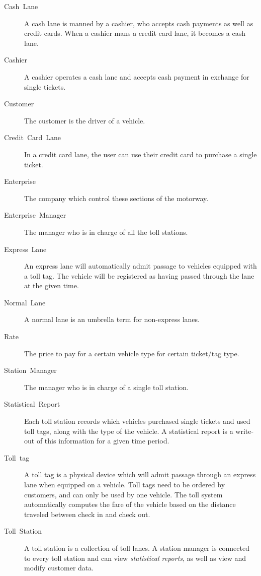 \begin{description}
\item [{Cash~Lane}] A cash lane is manned by a cashier, who accepts cash
payments as well as credit cards. When a cashier mans a credit card
lane, it becomes a cash lane.

\item [{Cashier}] A cashier operates a cash lane and accepts cash payment
in exchange for single tickets.

\item [{Customer}] The customer is the driver of a vehicle.

\item [{Credit~Card~Lane}] In a credit card lane, the user can use their
credit card to purchase a single ticket.

\item [{Enterprise}] The company which control these sections of the motorway.

\item [{Enterprise~Manager}] The manager who is in charge of all the toll stations.

\item [{Express~Lane}] An express lane will automatically admit passage
to vehicles equipped with a toll tag. The vehicle will be registered
as having passed through the lane at the given time.

\item [{Normal~Lane}] A normal lane is an umbrella term for non-express lanes.

\item [{Rate}] The price to pay for a certain vehicle type for certain ticket/tag type.

\item [{Station~Manager}] The manager who is in charge of a single toll station.

\item [{Statistical~Report}] Each toll station records which vehicles
purchased single tickets and used toll tags, along with the type of
the vehicle. A statistical report is a write-out of this information
for a given time period.

\item [{Toll~tag}] A toll tag is a physical device which will admit passage
through an express lane when equipped on a vehicle. Toll tags need
to be ordered by customers, and can only be used by one vehicle. The
toll system automatically computes the fare of the vehicle based on
the distance traveled between check in and check out.

\item [{Toll~Station}] A toll station is a collection of toll lanes. A
station manager is connected to every toll station and can view \emph{statistical
reports}, as well as view and modify customer data.

\end{description}
